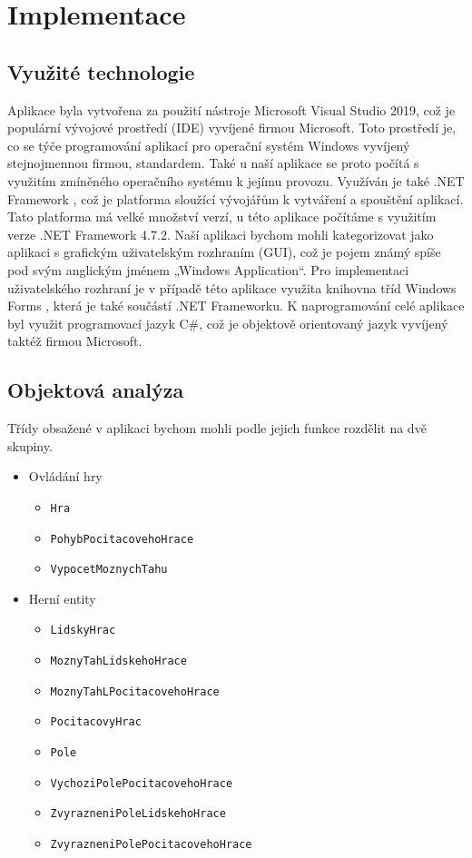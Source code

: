 \chapter{Implementace}
\section{Využité technologie}
Aplikace byla vytvořena za použití nástroje Microsoft Visual Studio 2019, což je populární vývojové prostředí (IDE) vyvíjené firmou Microsoft. Toto prostředí je, co se týče programování aplikací pro operační systém Windows vyvíjený stejnojmennou firmou, standardem. Také u naší aplikace se proto počítá s využitím zmíněného operačního systému k jejímu provozu. Využíván je také .NET Framework \cite{net-framework}, což je platforma sloužící vývojářům k vytváření a spouštění aplikací. Tato platforma má velké množství verzí, u této aplikace počítáme s využitím verze .NET Framework 4.7.2. Naší aplikaci bychom mohli kategorizovat jako aplikaci s grafickým uživatelským rozhraním (GUI), což je pojem známý spíše pod svým anglickým jménem „Windows Application“. Pro implementaci uživatelského rozhraní je v případě této aplikace využita knihovna tříd Windows Forms \cite{winforms}, která je také součástí .NET Frameworku. K naprogramování celé aplikace byl využit programovací jazyk C\#, což je objektově orientovaný jazyk vyvíjený taktéž firmou Microsoft.

\section{Objektová analýza}
Třídy obsažené v aplikaci bychom mohli podle jejich funkce rozdělit na dvě skupiny.
\begin{itemize}
	\item Ovládání hry
		\begin{itemize}
		\item \lstinline$Hra$
		\item \lstinline$PohybPocitacovehoHrace$
		\item \lstinline$VypocetMoznychTahu$
	\end{itemize}
	\item Herní entity
		\begin{itemize}
		\item \lstinline$LidskyHrac$
		\item \lstinline$MoznyTahLidskehoHrace$
		\item \lstinline$MoznyTahLPocitacovehoHrace$
		\item \lstinline$PocitacovyHrac$
		\item \lstinline$Pole$
		\item \lstinline$VychoziPolePocitacovehoHrace$
		\item \lstinline$ZvyrazneniPoleLidskehoHrace$
		\item \lstinline$ZvyrazneniPolePocitacovehoHrace$
	\end{itemize}
\end{itemize}

